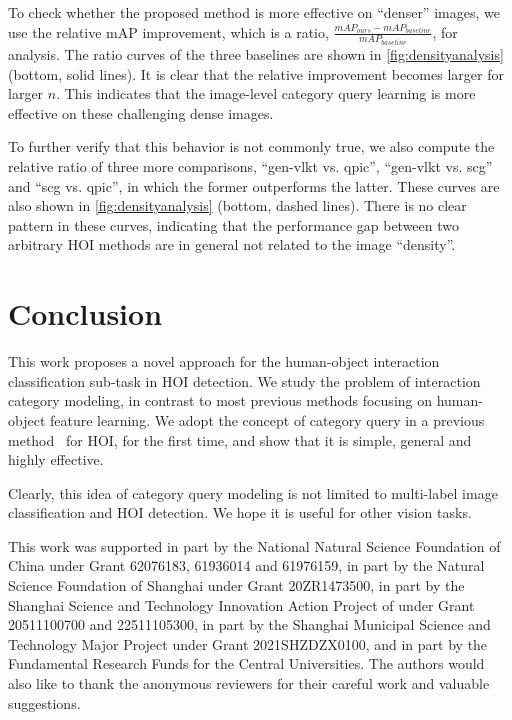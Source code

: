\documentclass[10pt,twocolumn,letterpaper]{article}
\begin{document}
To check whether the proposed method is more effective on ``denser'' images, we use the relative mAP improvement, which is a ratio, $\frac{mAP_{ours}-mAP_{baseline}}{mAP_{baseline}}$, for analysis. The ratio curves of the three baselines are shown in \cref{fig:densityanalysis} (bottom, solid lines). It is clear that the relative improvement becomes larger for larger $n$. This indicates that the image-level category query learning is more effective on these challenging dense images.

To further verify that this behavior is not commonly true, we also compute the relative ratio of three more comparisons, ``gen-vlkt vs. qpic'', ``gen-vlkt vs. scg'' and ``scg vs. qpic'', in which the former outperforms the latter. These curves are also shown in \cref{fig:densityanalysis} (bottom, dashed lines). There is no clear pattern in these curves, indicating that the performance gap between two arbitrary HOI methods are in general not related to the image ``density''.

\section{Conclusion}
This work proposes a novel approach for the human-object interaction classification sub-task in HOI detection. We study the problem of interaction category modeling, in contrast to most previous methods focusing on human-object feature learning. We adopt the concept of category query in a previous method~\cite{liu2021query2label} for HOI, for the first time, and show that it is simple, general and highly effective.

Clearly, this idea of category query modeling is not limited to multi-label image classification and HOI detection. We hope it is useful for other vision tasks.


This work was supported in part by the National Natural Science Foundation of China under Grant 62076183, 61936014 and 61976159, in part by the Natural Science Foundation of Shanghai under Grant 20ZR1473500, in part by the Shanghai Science and Technology Innovation Action Project of under Grant 20511100700 and 22511105300, in part by the Shanghai Municipal Science and Technology Major Project under Grant 2021SHZDZX0100, and in part by the Fundamental Research Funds for the Central Universities. The authors would also like to thank the anonymous reviewers for their careful work and valuable suggestions.


{\small


}
\end{document}
